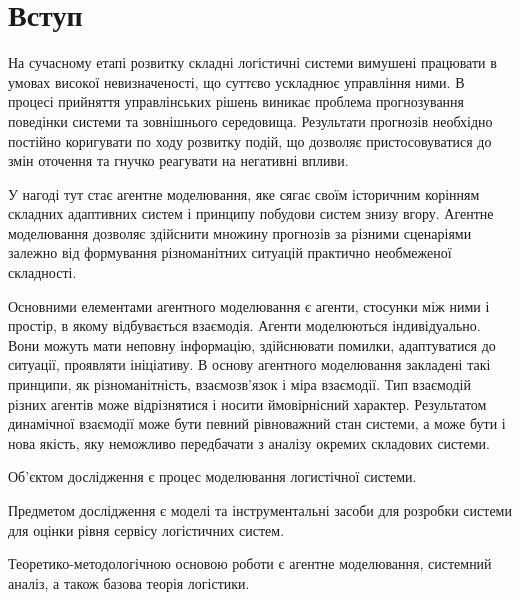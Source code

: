 \section*{Вступ}


На сучасному етапі розвитку складні логістичні системи вимушені працювати в умовах високої невизначеності, що суттєво ускладнює управління ними. 
В процесі прийняття управлінських рішень виникає проблема прогнозування поведінки системи та зовнішнього середовища. 
Результати прогнозів необхідно постійно коригувати по ходу розвитку подій, що дозволяє пристосовуватися до змін оточення та гнучко реагувати на негативні впливи. 

У нагоді тут стає агентне моделювання, яке сягає своїм історичним корінням складних адаптивних систем і принципу побудови систем знизу вгору.
Агентне моделювання дозволяє здійснити множину прогнозів за різними сценаріями залежно від формування різноманітних ситуацій практично необмеженої складності. 

Основними елементами агентного моделювання є агенти, стосунки між ними і простір, в якому відбувається взаємодія. 
Агенти моделюються індивідуально. 
Вони можуть мати неповну інформацію, здійснювати помилки, адаптуватися до ситуації, проявляти ініціативу. 
В основу агентного моделювання закладені такі принципи, як різноманітність, взаємозв’язок і міра взаємодії. 
Тип взаємодій різних агентів може відрізнятися і носити ймовірнісний характер. 
Результатом динамічної взаємодії може бути певний рівноважний стан системи, а може бути і нова якість, яку неможливо передбачати з аналізу окремих складових системи.

Об'єктом дослідження є процес моделювання логистічної системи. 

Предметом дослідження є моделі та інструментальні засоби для розробки системи для оцінки рівня сервісу логістичних систем.

Теоретико-методологічною основою роботи є агентне моделювання, системний аналіз, а також базова теорія логістики.

